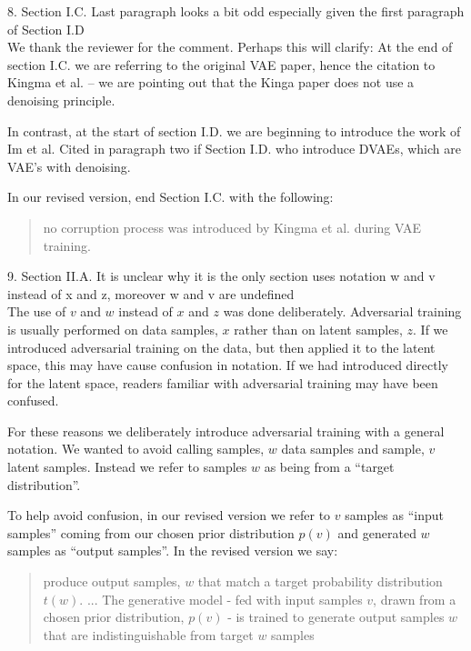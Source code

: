 \documentclass{article}
\begin{document}
{\color{blue}
8. Section I.C. Last paragraph looks a bit odd especially given the first paragraph of Section I.D}\\

We thank the reviewer for the comment.  Perhaps this will clarify: At the end of section I.C. we are referring to the original VAE paper, hence the citation to Kingma et al. -- we are pointing out that the Kinga paper does not use a denoising principle.

In contrast, at the start of section I.D. we are beginning to introduce the work of Im et al. Cited in paragraph two if Section I.D. who introduce DVAEs, which are VAE's with denoising.

In our revised version, end Section I.C. with the following:
\begin{quote}
     no corruption process was introduced by Kingma et al. during VAE training.
\end{quote}

{\color{blue}
9. Section II.A. It is unclear why it is the only section uses notation w and v instead of x and z, moreover w and v are undefined}\\

The use of $v$ and $w$ instead of $x$ and $z$ was done deliberately. Adversarial training is usually performed on data samples, $x$ rather than on latent samples, $z$. If we introduced adversarial training on the data, but then applied it to the latent space, this may have cause confusion in notation. If we had introduced directly for the latent space, readers familiar with adversarial training may have been confused. 

For these reasons we deliberately introduce adversarial training with a general notation. We wanted to avoid calling samples, $w$ data samples and sample, $v$ latent samples. Instead we refer to samples $w$ as being from a ``target distribution''.

To help avoid confusion, in our revised version we refer to $v$ samples as ``input samples'' coming from our chosen prior distribution $p(v)$ and generated $w$ samples as ``output samples''. In the revised version we say:
    
    \begin{quote}
        produce output samples, $w$ that match a target probability distribution $t(w)$. \newline ... \newline
        The generative model - fed with input samples $v$, drawn from a chosen prior distribution, $p(v)$ - is trained to generate output samples $w$ that are indistinguishable from target $w$ samples  
    \end{quote}
\end{document}
